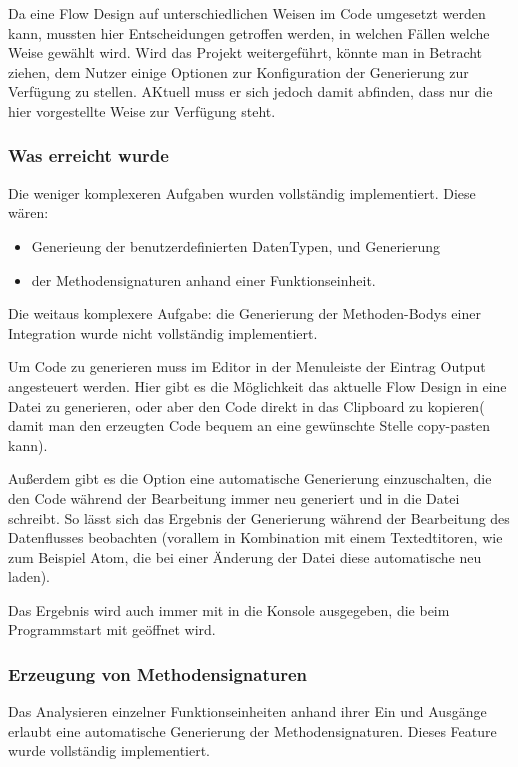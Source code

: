 Da eine Flow Design auf unterschiedlichen Weisen im Code umgesetzt werden
kann, mussten hier Entscheidungen getroffen werden, in welchen Fällen
welche Weise gewählt wird. Wird das Projekt weitergeführt, könnte man in
Betracht ziehen, dem Nutzer einige Optionen zur Konfiguration der Generierung
zur Verfügung zu stellen. AKtuell muss er sich jedoch damit abfinden, dass
nur die hier vorgestellte Weise zur Verfügung steht.


\subsubsection{Was erreicht wurde}
\label{sec:orgheadline34}
Die weniger komplexeren Aufgaben wurden vollständig implementiert.
Diese wären: 
\begin{itemize}
	\item Generieung der benutzerdefinierten DatenTypen, und Generierung
	\item der Methodensignaturen anhand einer Funktionseinheit.
\end{itemize}

Die weitaus komplexere Aufgabe: die Generierung der Methoden-Bodys einer Integration wurde nicht
vollständig implementiert.

Um Code zu generieren muss im Editor in der Menuleiste der Eintrag Output
angesteuert werden.
Hier gibt es die Möglichkeit das aktuelle Flow Design in eine Datei zu
generieren, oder aber den Code direkt in das Clipboard zu kopieren( damit man den erzeugten Code bequem an
eine gewünschte Stelle copy-pasten kann).

Außerdem gibt es die Option eine automatische Generierung einzuschalten, die
den Code während der Bearbeitung immer neu generiert und in die Datei
schreibt. So lässt sich das Ergebnis der Generierung während der Bearbeitung
des Datenflusses beobachten (vorallem in Kombination mit einem
Textedtitoren, wie zum Beispiel Atom, die bei einer Änderung der Datei diese automatische neu laden).

Das Ergebnis wird auch immer mit in die Konsole ausgegeben, die beim
Programmstart mit geöffnet wird.

\subsubsection{Erzeugung von Methodensignaturen}
\label{sec:orgheadline41}
Das Analysieren einzelner Funktionseinheiten anhand ihrer Ein und Ausgänge
erlaubt eine automatische Generierung der Methodensignaturen.
Dieses Feature wurde vollständig implementiert.

